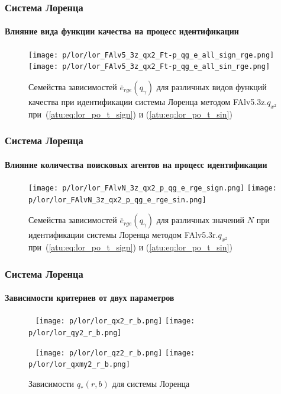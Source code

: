\documentclass[10pt,utf8]{beamer}
\begin{document}
\begin{frame}
  \frametitle{Система Лоренца}
  \framesubtitle{Влияние вида функции качества на процесс идентификации}

  \begin{figure}[h!]
    \centerline{
      \texttt{[image: p/lor/lor\_FAlv5\_3z\_qx2\_Ft-p\_qg\_e\_all\_sign\_rge.png]}
      \hfill
      \texttt{[image: p/lor/lor\_FAlv5\_3z\_qx2\_Ft-p\_qg\_e\_all\_sin\_rge.png]}
    }
    \caption{Семейства зависимостей $\overline{e}_{rge}(q_\gamma)$ для различных видов функций качества при идентификации системы Лоренца методом FAlv5.3z.$q_{x^2}$
     при~(\ref{atu:eq:lor_po_t_sign}) и (\ref{atu:eq:lor_po_t_sin})}
    \label{atu:f:lor_ftype_rge}
  \end{figure}

\end{frame}



\begin{frame}
  \frametitle{Система Лоренца}
  \framesubtitle{Влияние количества поисковых агентов на процесс идентификации}


  \begin{figure}[h!]
    \centerline{
      \texttt{[image: p/lor/lor\_FAlvN\_3z\_qx2\_p\_qg\_e\_rge\_sign.png]}
      \hfill
      \texttt{[image: p/lor/lor\_FAlvN\_3z\_qx2\_p\_qg\_e\_rge\_sin.png]}
    }
    \caption{Семейства зависимостей $\overline{e}_{rge}(q_\gamma)$ для различных значений $N$ при идентификации системы Лоренца методом FAlv5.3r.$q_{x^2}$
     при~(\ref{atu:eq:lor_po_t_sign}) и (\ref{atu:eq:lor_po_t_sin})}
    \label{atu:f:lor_N_rge}
  \end{figure}


\end{frame}



\begin{frame}
  \frametitle{Система Лоренца}
  \framesubtitle{Зависимости критериев от двух параметров}


  \begin{figure}[h!]
    \centerline{
      {~}\hfill
      \texttt{[image: p/lor/lor\_qx2\_r\_b.png]}
      \hfill
      \texttt{[image: p/lor/lor\_qy2\_r\_b.png]}
      \hfill{~}
    }
    \centerline{
      {~}\hfill
      \texttt{[image: p/lor/lor\_qz2\_r\_b.png]}
      \hfill
      \texttt{[image: p/lor/lor\_qxmy2\_r\_b.png]}
      \hfill{~}
    }
    \caption{Зависимости $q_{*}(r,b)$ для системы Лоренца }
    \label{atu:f:lor_qrb}
  \end{figure}


\end{frame}
\end{document}
